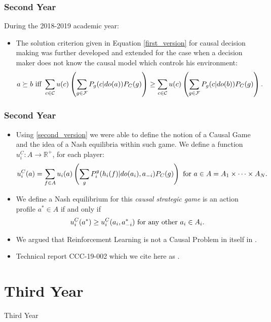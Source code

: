 \documentclass{beamer}
\theoremstyle{plain}
\begin{document}
\begin{frame}
\frametitle{Second Year}
During the 2018-2019 academic year:
\begin{itemize}
\item The solution criterion given in Equation \ref{first_version} for causal decision making was further developed and extended for the case when a decision maker does not know the causal model which controls his environment:
\begin{equation}{\label{second_version}}
a \succeq b \textrm{ iff } \sum_{c \in \mathcal{C}} u(c) \left( \sum_{g \in \mathcal{F}} P_g(c | do(a))P_C(g) \right) \geq \sum_{c \in \mathcal{C}}  u(c) \left( \sum_{g \in \mathcal{F}} P_g(c | do(b))P_C(g) \right).
\end{equation}
\end{itemize}
\end{frame}

\begin{frame}
\frametitle{Second Year}
\begin{itemize}
\item Using \ref{second_version} we were able to define the notion of a Causal Game and the idea of a Nash equilibria within such game. We define a function $u^C_i : A \to \mathbb{R}^{+}$, for each player:
\begin{equation}{\label{games_causal_ut}}
u^C_i (a) = \sum_{f \in A}  u_i(a) \left( \sum_g P^g_i (h_i(f) | do(a_i), a_{-i}) P_C(g) \right) \textrm{ for } a \in A=A_1 \times \cdots \times A_N.
\end{equation}
\item We define a Nash equilibrium for this \textit{causal strategic game} is an action profile $a^\ast \in A$ if and only if
\begin{equation}{\label{nash_eq}}
 u^C_i(a^\ast) \geq u^C_i(a_i, a^\ast_{-i}) \textrm{ for any other } a_i \in A_i. 
 \end{equation}
 \item We argued that Reinforcement Learning is not a Causal Problem in itself in \cite{gonzalez2019reinforcement}.
 \item Technical report CCC-19-002 which we cite here as \cite{gonzalez2019causal}. 
\end{itemize}
\end{frame}

\section{Third Year}
\begin{frame}
\begin{center}
\LARGE{Third Year}
\end{center}
\end{frame}
\end{document}

